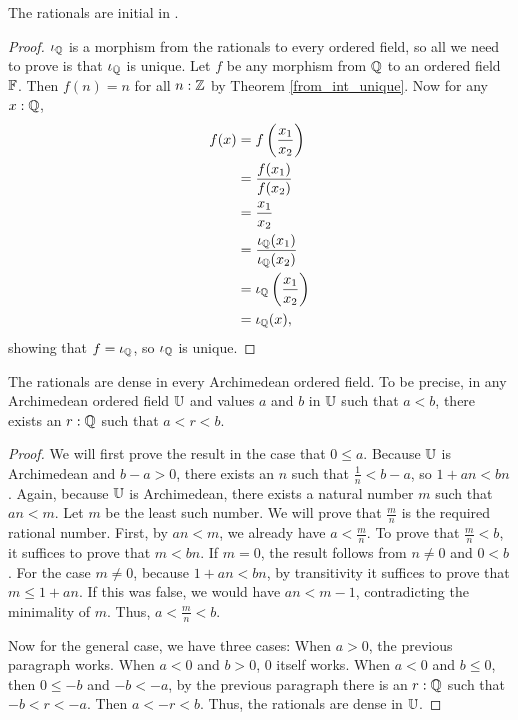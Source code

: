 \documentclass[../../math.tex]{subfiles}
\begin{document}
\begin{theorem} \label{rat_initial}
    The rationals are initial in .
\end{theorem}
\begin{proof}
    $\iota_{\mathbb{Q}}$ is a morphism from the rationals to every ordered field, so all we
    need to prove is that $\iota_{\mathbb{Q}}$ is unique.  Let $f$ be any morphism from $\mathbb{Q}$ to
    an ordered field $\mathbb{F}$.  Then $f(n) = n$ for all $n : \mathbb{Z}$ by Theorem
    \ref{from_int_unique}.  Now for any $x : \mathbb{Q}$,
    \begin{align*}
        f(x)
        &= f \left( \frac{x_1}{x_2} \right) \\
        &= \frac{f(x_1)}{f(x_2)} \\
        &= \frac{x_1}{x_2} \\
        &= \frac{\iota_{\mathbb{Q}}(x_1)}{\iota_{\mathbb{Q}}(x_2)} \\
        &= \iota_{\mathbb{Q}} \left( \frac{x_1}{x_2} \right) \\
        &= \iota_{\mathbb{Q}}(x),
    \end{align*}
    showing that $f = \iota_{\mathbb{Q}}$, so $\iota_{\mathbb{Q}}$ is unique.
\end{proof}

\begin{theorem} \label{rat_dense_in_arch}
    The rationals are dense in every Archimedean ordered field.  To be precise,
    in any Archimedean ordered field $\mathbb{U}$ and values $a$ and $b$ in $\mathbb{U}$ such
    that $a < b$, there exists an $r : \mathbb{Q}$ such that $a < r < b$.
\end{theorem}
\begin{proof}
    We will first prove the result in the case that $0 \leq a$.  Because $\mathbb{U}$ is
    Archimedean and $b - a > 0$, there exists an $n$ such that $\frac{1}{n} <
    b - a$, so $1 + an < bn$.  Again, because $\mathbb{U}$ is Archimedean, there exists
    a natural number $m$ such that $an < m$.  Let $m$ be the least such number.
    We will prove that $\frac{m}{n}$ is the required rational number.  First, by
    $an < m$, we already have $a < \frac{m}{n}$.  To prove that $\frac{m}{n} <
    b$, it suffices to prove that $m < bn$.  If $m = 0$, the result follows from
    $n \neq 0$ and $0 < b$.  For the case $m \neq 0$, because $1 + an < bn$, by
    transitivity it suffices to prove that $m \leq 1 + an$.  If this was false,
    we would have $an < m - 1$, contradicting the minimality of $m$.  Thus,
    $a < \frac{m}{n} < b$.

    Now for the general case, we have three cases: When $a > 0$, the previous
    paragraph works.  When $a < 0$ and $b > 0$, $0$ itself works.  When $a < 0$
    and $b \leq 0$, then $0 \leq -b$ and $-b < -a$, by the previous paragraph
    there is an $r : \mathbb{Q}$ such that $-b < r < -a$.  Then $a < -r < b$.  Thus, the
    rationals are dense in $\mathbb{U}$.
\end{proof}
\end{document}
